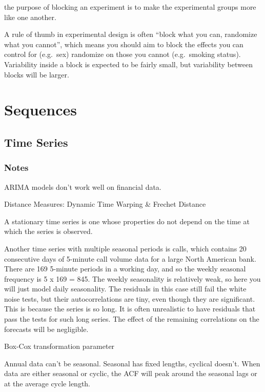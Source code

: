 \documentclass[]{book}
\begin{document}
the purpose of blocking an experiment is to make the experimental groups more like one another.

A rule of thumb in experimental design is often ``block what you can, randomize what you cannot'', which means you should aim to block the effects you can control for (e.g.~sex) randomize on those you cannot (e.g.~smoking status). Variability inside a block is expected to be fairly small, but variability between blocks will be larger.

\hypertarget{sequences}{%
\chapter{Sequences}\label{sequences}}

\hypertarget{time-series}{%
\section{Time Series}\label{time-series}}

\hypertarget{notes}{%
\subsection{Notes}\label{notes}}

ARIMA models don't work well on financial data.

Distance Measures: Dynamic Time Warping \& Frechet Distance

A stationary time series is one whose properties do not depend on the time at which the series is observed.

Another time series with multiple seasonal periods is calls, which contains 20 consecutive days of 5-minute call volume data for a large North American bank. There are 169 5-minute periods in a working day, and so the weekly seasonal frequency is 5 x 169 = 845. The weekly seasonality is relatively weak, so here you will just model daily seasonality. The residuals in this case still fail the white noise tests, but their autocorrelations are tiny, even though they are significant. This is because the series is so long. It is often unrealistic to have residuals that pass the tests for such long series. The effect of the remaining correlations on the forecasts will be negligible.

Box-Cox transformation parameter

Annual data can't be seasonal. Seasonal has fixed lengths, cyclical doesn't. When data are either seasonal or cyclic, the ACF will peak around the seasonal lags or at the average cycle length.
\end{document}
